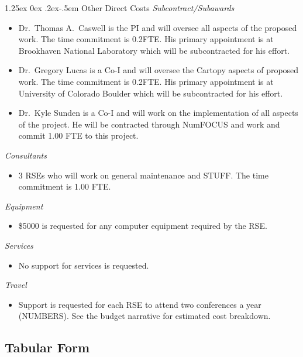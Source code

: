\documentclass[12pt]{article}
\makeatletter
\numberwithin{page}{section}
\renewcommand{\paragraph}{%
  \@startsection{paragraph}{4}%
  {\z@}{1.25ex \@plus 0ex \@minus .2ex}{-.5em}%
  {\normalfont\normalsize\itshape\bfseries}%
}
\makeatother
\begin{document}
\paragraph{Other Direct Costs}
\textit{Subcontract/Subawards}
\begin{itemize}
  \item Dr.\ Thomas A.\ Caswell is the PI and will oversee all aspects of the
  proposed work.  The time commitment is 0.2FTE.  His primary
  appointment is at Brookhaven National Laboratory which will be
  subcontracted for his effort.
\item Dr.\ Gregory Lucas is a Co-I and will oversee the Cartopy aspects of
  proposed work.  The time commitment is 0.2FTE.  His primary appointment is at
  University of Colorado Boulder which will be subcontracted for his effort.
\item Dr.\ Kyle Sunden is a Co-I and will work on the implementation of all
  aspects of the project.  He will be contracted through NumFOCUS and work and
  commit 1.00 FTE to this project.
\end{itemize}
\textit{Consultants}
\begin{itemize}
\item 3 RSEs who will work on general maintenance and STUFF.  The time commitment is 1.00
  FTE.
\end{itemize}
\textit{Equipment}
\begin{itemize}
\item \$5000 is requested for any computer equipment required by the RSE.
\end{itemize}
\textit{Services}
\begin{itemize}
\item No support for services is requested.
\end{itemize}
\textit{Travel}
\begin{itemize}
\item Support is requested for each RSE to attend two conferences a
  year (NUMBERS).  See the budget narrative for estimated cost
  breakdown.
\end{itemize}

\subsection{Tabular Form}

\end{document}

